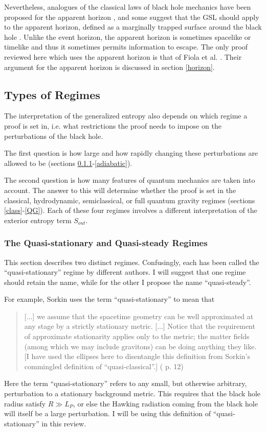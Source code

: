 \documentclass[12pt]{article}
\begin{document}
Nevertheless, analogues of the classical laws of black hole mechanics have been proposed for the apparent horizon \cite{hayward93}, and some suggest that the GSL should apply to the apparent horizon, defined as a marginally trapped surface around the black hole \cite{ZWGA07}.  Unlike the event horizon, the apparent horizon is sometimes spacelike or timelike and thus it sometimes permits information to escape.  The only proof reviewed here which uses the apparent horizon is that of Fiola et al. \cite{fiola94}.  Their argument for the apparent horizon is discussed in section \ref{horizon}.

\subsection{Types of Regimes}\label{regimes}

The interpretation of the generalized entropy also depends on which regime a proof is set in, i.e. what restrictions the proof needs to impose on the perturbations of the black hole.

The first question is how large and how rapidly changing these perturbations are allowed to be (sections \ref{quasi}-\ref{adiabatic}).

The second question is how many features of quantum mechanics are taken into account.  The answer to this will determine whether the proof is set in the classical, hydrodynamic, semiclassical, or full quantum gravity regimes (sections \ref{class}-\ref{QG}).  Each of these four regimes involves a different interpretation of the exterior entropy term $S_{out}$.

\subsubsection{The Quasi-stationary and Quasi-steady Regimes}\label{quasi}

This section describes two distinct regimes.  Confusingly, each has been called the ``quasi-stationary'' regime by different authors.  I will suggest that one regime should retain the name, while for the other I propose the name ``quasi-steady''.

For example, Sorkin uses the term ``quasi-stationary'' to mean that
\begin{quote}\small
[...] we assume that the spacetime geometry can be well approximated at any stage by a strictly stationary metric. [...] Notice that the requirement of approximate stationarity applies only to the metric; the matter fields (among which we may include gravitons) can be doing anything they like.  [I have used the ellipses here to disentangle this definition from Sorkin's commingled definition of ``quasi-classical''.] (\cite{sorkin98} p. 12) \end{quote}
Here the term ``quasi-stationary'' refers to any small, but otherwise arbitrary, perturbation to a stationary background metric.  This requires that the black hole radius satisfy $R \gg L_P$, or else the Hawking radiation coming from the black hole will itself be a large perturbation.  I will be using this definition of ``quasi-stationary'' in this review.
\end{document}
